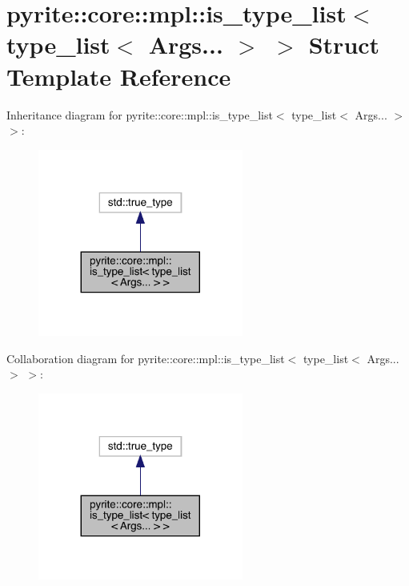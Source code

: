 \hypertarget{structpyrite_1_1core_1_1mpl_1_1is__type__list_3_01type__list_3_01_args_8_8_8_01_4_01_4}{}\section{pyrite\+:\+:core\+:\+:mpl\+:\+:is\+\_\+type\+\_\+list$<$ type\+\_\+list$<$ Args... $>$ $>$ Struct Template Reference}
\label{structpyrite_1_1core_1_1mpl_1_1is__type__list_3_01type__list_3_01_args_8_8_8_01_4_01_4}


Inheritance diagram for pyrite\+:\+:core\+:\+:mpl\+:\+:is\+\_\+type\+\_\+list$<$ type\+\_\+list$<$ Args... $>$ $>$\+:
\nopagebreak
\begin{figure}[H]
\begin{center}
\leavevmode
\includegraphics[width=191pt]{d9/dc3/structpyrite_1_1core_1_1mpl_1_1is__type__list_3_01type__list_3_01_args_8_8_8_01_4_01_4__inherit__graph}
\end{center}
\end{figure}


Collaboration diagram for pyrite\+:\+:core\+:\+:mpl\+:\+:is\+\_\+type\+\_\+list$<$ type\+\_\+list$<$ Args... $>$ $>$\+:
\nopagebreak
\begin{figure}[H]
\begin{center}
\leavevmode
\includegraphics[width=191pt]{de/d80/structpyrite_1_1core_1_1mpl_1_1is__type__list_3_01type__list_3_01_args_8_8_8_01_4_01_4__coll__graph}
\end{center}
\end{figure}


